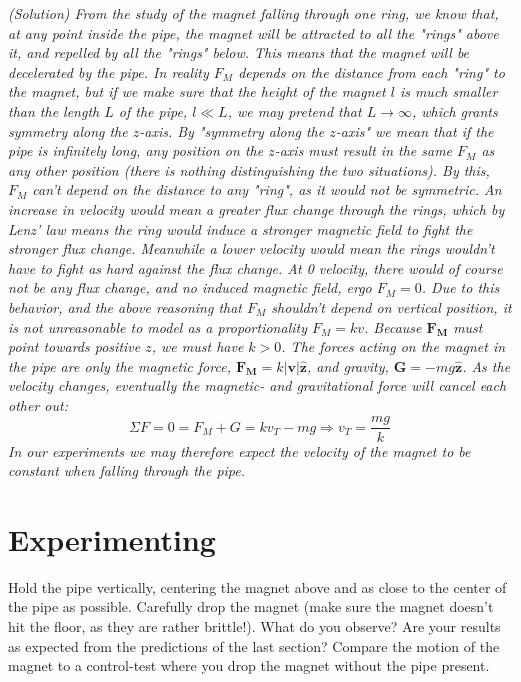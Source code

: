 \documentclass[%
oneside,                 %
final,                   %
10pt]{article}
\begin{document}
\noindent
\emph{(Solution) From the study of the magnet falling through one ring, we know that, at any point inside the pipe, the magnet will be attracted to all the "rings" above it, and repelled by all the "rings" below. This means that the magnet will be decelerated by the pipe.
In reality $F_M$ depends on the distance from each "ring" to the magnet, but if we make sure that the height of the magnet $l$ is much smaller than the length $L$ of the pipe, $l \ll L$, we may pretend that $L \rightarrow \infty$, which grants symmetry along the $z$-axis.
By "symmetry along the $z$-axis" we mean that if the pipe is infinitely long, any position on the $z$-axis must result in the same $F_M$ as any other position (there is nothing distinguishing the two situations). By this, $F_M$ can't depend on the distance to any "ring", as it would not be symmetric.
\newline An increase in velocity would mean a greater flux change through the rings, which by Lenz' law means the ring would induce a stronger magnetic field to fight the stronger flux change. Meanwhile a lower velocity would mean the rings wouldn't have to fight \textit{as} hard against the flux change.
At 0 velocity, there would of course not be any flux change, and no induced magnetic field, ergo $F_M = 0$. Due to this behavior, and the above reasoning that $F_M$ shouldn't depend on vertical position, it is not unreasonable to model as a proportionality $F_M = k v$. Because $\mathbf{F_M}$ must point towards positive $z$, we must have $k >0$.
\newline The forces acting on the magnet in the pipe are only the magnetic force, $\mathbf{F_M}=k|\mathbf{v}|\mathbf{\hat{z}}$, and gravity, $\mathbf{G} = -mg \mathbf{\hat{z}}$.
As the velocity changes, eventually the magnetic- and gravitational force will cancel each other out:
\begin{equation} \label{eq:vt}
\Sigma F = 0 = F_M + G = kv_T -mg \Rightarrow v_T = \frac{mg}{k}
\end{equation}
In our experiments we may therefore expect the velocity of the magnet to be constant when falling through the pipe.
}


\section{Experimenting}
\label{title:exp}
Hold the pipe vertically, centering the magnet above and as close to the center of the pipe as possible. Carefully drop the magnet (make sure the magnet doesn't hit the floor, as they are rather brittle!).
What do you observe? Are your results as expected from the predictions of the last section? Compare the motion of the magnet to a control-test where you drop the magnet without the pipe present.
\end{document}
